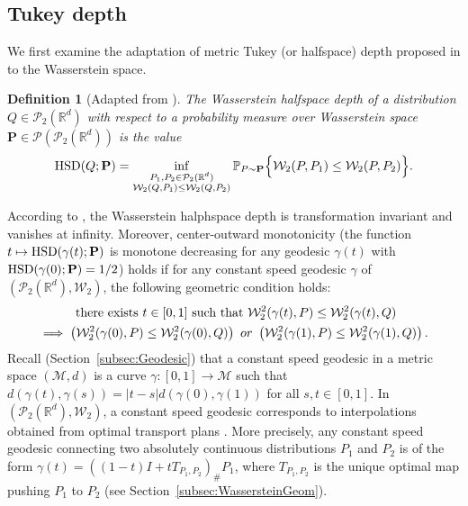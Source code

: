 \documentclass{imsart}
\newtheorem {Definition}{Definition}[section]
\numberwithin{equation}{section}
\def\R{\mathbb{R}}
\begin{document}
\subsection{Tukey depth}
We first examine the adaptation of metric Tukey (or halfspace) depth proposed in \cite{LopezTukeyMetric} to the Wasserstein space. 
\begin{Definition} [Adapted from \citep{LopezTukeyMetric}]
	The Wasserstein halfspace depth of a distribution $Q\in \mathcal{P}_2(\R^d)$ with respect to a probability measure over Wasserstein space $\mathbf{P} \in \mathcal{P}(\mathcal{P}_2(\R^d))$ is the value 
	$$ \mathrm{HSD}(Q; {\bf P})=\inf_{ \substack{P_1,P_2\in \mathcal{P}_2(\R^d) \\ \mathcal{W}_2(Q,P_1) \leq \mathcal{W}_2(Q,P_2)  }}\mathbb{P}_{P\sim \mathbf{P}} \Big\{ \mathcal{W}_2(P,P_1) \leq \mathcal{W}_2(P,P_2) \Big\}.  $$
\end{Definition}
According to \citep{LopezTukeyMetric}, the Wasserstein halphspace depth is transformation invariant and vanishes at infinity.  Moreover, center-outward monotonicity (the function   $t\mapsto \mathrm{HSD}(\gamma(t); {\bf P})$ is monotone decreasing for any geodesic $\gamma(t)$ with $\mathrm{HSD}(\gamma(0); {\bf P})=1/2$) holds if for any constant speed geodesic $\gamma$ of $(\mathcal{P}_2(\R^d), \mathcal{W}_2)$, the following geometric condition holds: 
\begin{multline}\label{eq:centerTukey}
	\text{ there exists $t\in [0,1] $ such that  }\mathcal{W}_2^2(\gamma(t), P)\leq 
	\mathcal{W}_2^2(\gamma(t), Q) \\
	\implies \left(\mathcal{W}_2^2(\gamma(0), P)\leq 
	\mathcal{W}_2^2(\gamma(0), Q) \right)\ {\rm or}\ \left(\mathcal{W}_2^2(\gamma(1), P)\leq 
	\mathcal{W}_2^2(\gamma(1), Q) \right)  . 
\end{multline}
Recall (Section~\ref{subsec:Geodesic}) that a constant speed geodesic in a metric space $(\mathcal{M},d)$ is a curve $\gamma : [0, 1] \to \mathcal{M}$  such that $d(\gamma(t), \gamma(s))=|t-s| d(\gamma(0), \gamma(1))$ for all $s, t\in [0,1]$.  In $(\mathcal{P}_2(\R^d), \mathcal{W}_2)$, a constant speed geodesic corresponds to interpolations obtained from optimal transport plans \cite[p. 158]{AmbrosioGradient}. More precisely, any constant speed geodesic connecting two absolutely continuous distributions $P_1$ and $P_2$ is of the form $ \gamma(t)=((1-t)I + tT_{P_1,P_2})_\# P_1 $, where $T_{P_1,P_2}$ is the unique optimal map pushing $P_1$ to $P_2$ (see Section~\ref{subsec:WassersteinGeom}).  
\end{document}
